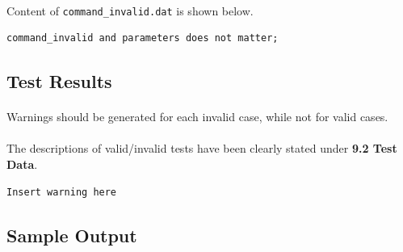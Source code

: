 \documentclass{article}
\begin{document}
            \paragraph{}
                Content of \texttt{command\_invalid.dat} is shown below.
            \begin{Verbatim}[gobble=8]
                command_invalid and parameters does not matter;
            \end{Verbatim}
        \subsection{Test Results}
            \paragraph{}
                Warnings should be generated for each invalid case, while not for valid cases. 
            \paragraph{}
                The descriptions of valid/invalid tests have been clearly stated under
                \textbf{9.2 Test Data}.
            \begin{Verbatim}[gobble=8]
                Insert warning here
            \end{Verbatim}
        \subsection{Sample Output}
\end{document}
